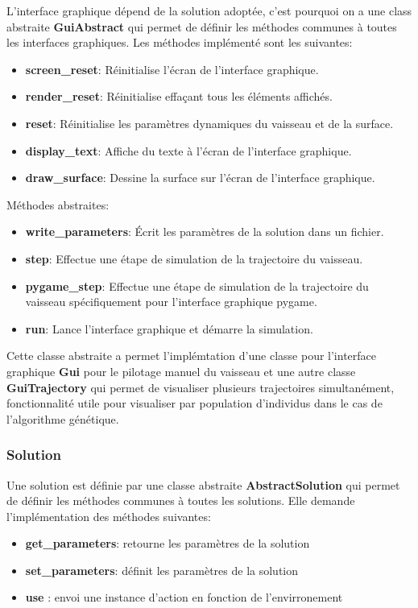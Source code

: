 \documentclass[french,a4paper,10pt,twocolumn]{article}
\begin{document}
L'interface graphique dépend de la solution adoptée, c'est pourquoi on a une class abstraite \textbf{GuiAbstract} qui permet de définir les méthodes communes à toutes les interfaces graphiques.
Les méthodes implémenté sont les suivantes:
\begin{itemize}
    \item \textbf{screen\_reset}: Réinitialise l'écran de l'interface graphique.
    \item \textbf{render\_reset}: Réinitialise effaçant tous les éléments affichés.
    \item \textbf{reset}: Réinitialise les paramètres dynamiques du vaisseau et de la surface.
    \item \textbf{display\_text}: Affiche du texte à l'écran de l'interface graphique.
    \item \textbf{draw\_surface}: Dessine la surface sur l'écran de l'interface graphique.
\end{itemize}
Méthodes abstraites:

\begin{itemize}
    \item \textbf{write\_parameters}: Écrit les paramètres de la solution dans un fichier.
    \item \textbf{step}: Effectue une étape de simulation de la trajectoire du vaisseau.
    \item \textbf{pygame\_step}: Effectue une étape de simulation de la trajectoire du vaisseau spécifiquement pour l'interface graphique pygame.
    \item \textbf{run}: Lance l'interface graphique et démarre la simulation.
\end{itemize}

Cette classe abstraite a permet l'implémtation d'une classe pour l'interface graphique \textbf{Gui} pour le pilotage manuel du vaisseau et 
une autre classe \textbf{GuiTrajectory} qui permet de visualiser plusieurs trajectoires simultanément, fonctionnalité utile pour visualiser par
population d'individus dans le cas de l'algorithme génétique.

\subsubsection{Solution}    

Une solution est définie par une classe abstraite \textbf{AbstractSolution} qui permet de définir les méthodes communes à toutes les solutions.
Elle demande l'implémentation des méthodes suivantes:
\begin{itemize}
    \item \textbf{get\_parameters}: retourne les paramètres de la solution
    \item \textbf{set\_parameters}: définit les paramètres de la solution
    \item \textbf{use} : envoi une instance d'action en fonction de l'envirronement
\end{itemize}
\end{document}
